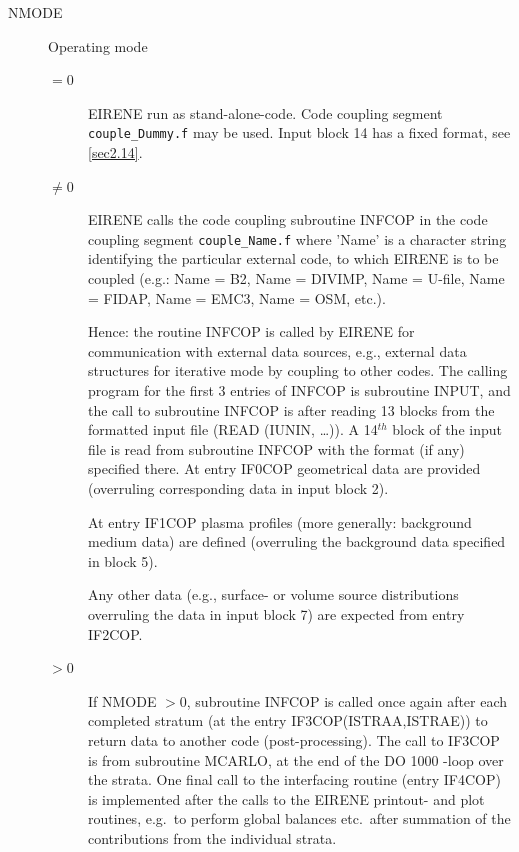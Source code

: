 \begin{description}
  \item[NMODE] Operating mode
        \begin{description}
          \item[$= 0$] EIRENE run as
                stand-alone-code.
                Code coupling segment \lstinline|couple_Dummy.f| may be used.
                Input block 14 has a fixed format, see \cref{sec2.14}.
          \item[$\ne 0$] EIRENE calls the code coupling subroutine INFCOP in the code
                coupling segment \lstinline|couple_Name.f| where 'Name' is a character string
                identifying the particular external code, to which EIRENE is to be coupled
                (e.g.: Name = B2, Name = DIVIMP, Name = U-file, Name = FIDAP, Name = EMC3, Name
                = OSM, etc.).

                Hence: the routine INFCOP is called by EIRENE for communication with external
                data sources, e.g., external data structures for iterative mode by coupling to
                other codes.
                The calling program for the first 3 entries of INFCOP is subroutine INPUT, and
                the call to subroutine INFCOP is after reading 13 blocks from the formatted
                input file (READ (IUNIN, \dots)).
                A 14$^{th}$ block of the input file is read from subroutine INFCOP with the
                format (if any) specified there.
                At entry IF0COP geometrical data are provided (overruling corresponding data in
                input block 2).

                At entry IF1COP plasma profiles (more generally: background medium data) are
                defined (overruling the background data specified in block 5).

                Any other data (e.g., surface- or volume source distributions overruling the
                data in input block 7) are expected from entry IF2COP.

          \item[$> 0$] If NMODE $> 0$, subroutine INFCOP is called once again after each
                completed stratum (at the entry IF3COP(ISTRAA,ISTRAE)) to return data to
                another code (post-processing).
                The call to IF3COP is from subroutine MCARLO, at the end of the DO 1000 -loop
                over the strata.
                One final call to the interfacing routine (entry IF4COP) is implemented after
                the calls to the EIRENE printout- and plot routines, e.g.\ to perform global
                balances etc.\ after summation of the contributions from the individual strata.


\end{description}
\end{description}
